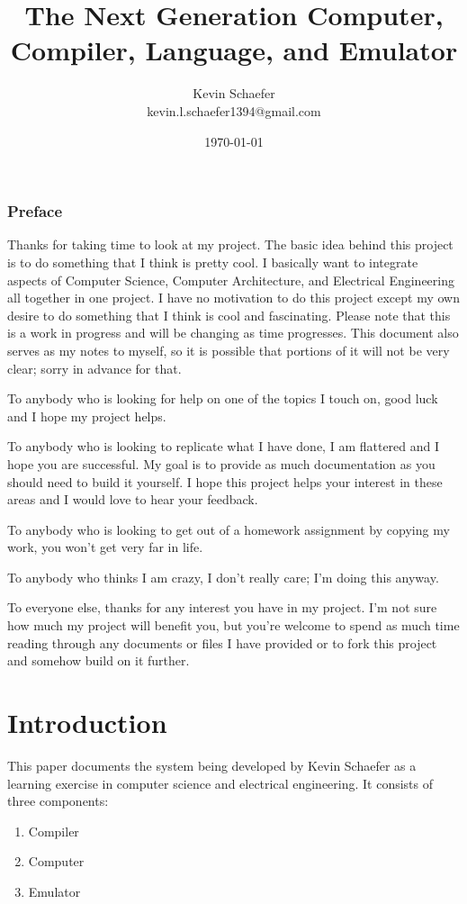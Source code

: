 \documentclass{book}
\title{The Next Generation Computer, Compiler, Language, and Emulator}
\date{\today}
\author{Kevin Schaefer \\ kevin.l.schaefer1394@gmail.com}
\begin{document}
\maketitle


\subsection*{Preface}
Thanks for taking time to look at my project. The basic idea behind this
project is to do something that I think is pretty cool. I basically want
to integrate aspects of Computer Science, Computer Architecture, and
Electrical Engineering all together in one project. I have no motivation
to do this project except my own desire to do something that I think is
cool and fascinating. Please note that this is a work in progress and will
be changing as time progresses. This document also serves as my notes to
myself, so it is possible that portions of it will not be very clear;
sorry in advance for that.

To anybody who is looking for help on one of the topics I touch on,
good luck and I hope my project helps.

To anybody who is looking to replicate what I have done, I am flattered
and I hope you are successful. My goal is to provide as much documentation
as you should need to build it yourself. I hope this project helps your
interest in these areas and I would love to hear your feedback.

To anybody who is looking to get out of a homework assignment by
copying my work, you won't get very far in life.

To anybody who thinks I am crazy, I don't really care; I'm doing this
anyway.

To everyone else, thanks for any interest you have in my project. I'm
not sure how much my project will benefit you, but you're welcome to
spend as much time reading through any documents or files I have provided
or to fork this project and somehow build on it further.


\tableofcontents

\chapter{Introduction}
This paper documents the system being developed by Kevin Schaefer as a learning
exercise in computer science and electrical engineering. It consists of three
components:
\begin{enumerate}
  \item Compiler
  \item Computer
  \item Emulator
\end{enumerate}
\end{document}
